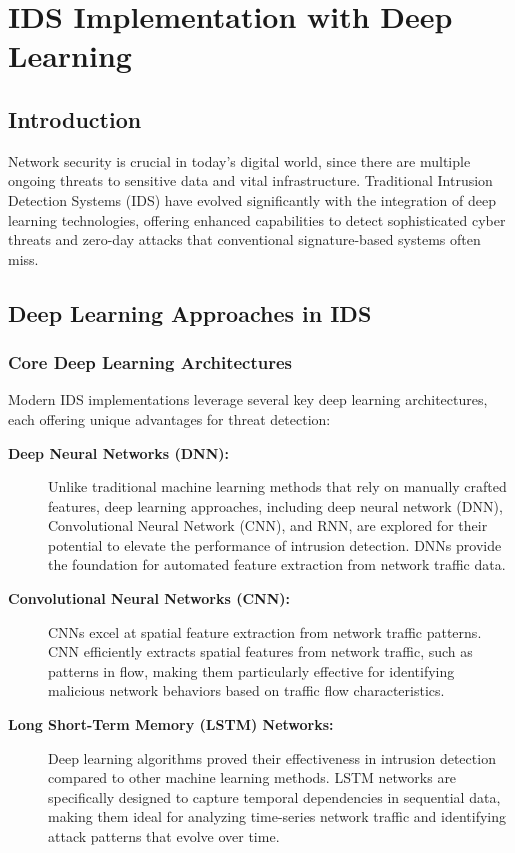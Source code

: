 \documentclass[12pt]{report}
\begin{document}
\section{IDS Implementation with Deep Learning}

\subsection{Introduction}

Network security is crucial in today's digital world, since there are multiple ongoing threats to sensitive data and vital infrastructure. Traditional Intrusion Detection Systems (IDS) have evolved significantly with the integration of deep learning technologies, offering enhanced capabilities to detect sophisticated cyber threats and zero-day attacks that conventional signature-based systems often miss.

\subsection{Deep Learning Approaches in IDS}

\subsubsection{Core Deep Learning Architectures}
Modern IDS implementations leverage several key deep learning architectures, each offering unique advantages for threat detection:

\begin{description}
    \item[\textbf{Deep Neural Networks (DNN):}] Unlike traditional machine learning methods that rely on manually crafted features, deep learning approaches, including deep neural network (DNN), Convolutional Neural Network (CNN), and RNN, are explored for their potential to elevate the performance of intrusion detection. DNNs provide the foundation for automated feature extraction from network traffic data.

    \item[\textbf{Convolutional Neural Networks (CNN):}] CNNs excel at spatial feature extraction from network traffic patterns. CNN efficiently extracts spatial features from network traffic, such as patterns in flow, making them particularly effective for identifying malicious network behaviors based on traffic flow characteristics.

    \item[\textbf{Long Short-Term Memory (LSTM) Networks:}] Deep learning algorithms proved their effectiveness in intrusion detection compared to other machine learning methods. LSTM networks are specifically designed to capture temporal dependencies in sequential data, making them ideal for analyzing time-series network traffic and identifying attack patterns that evolve over time.
\end{description}
\end{document}

